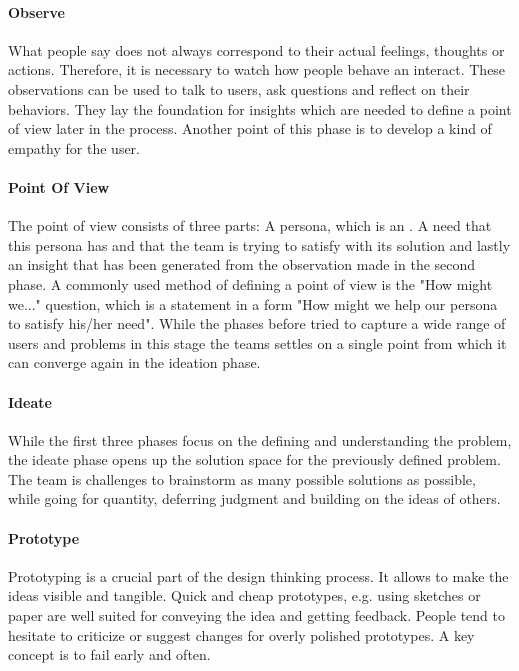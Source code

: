 \paragraph{Observe}
What people say does not always correspond to their actual feelings, thoughts or actions. Therefore, it is necessary to watch how people behave an interact. These observations can be used to talk to users, ask questions and reflect on their behaviors. They lay the foundation for insights which are needed to define a point of view later in the process. Another point of this phase is to develop a kind of empathy for the user.

\paragraph{Point Of View}
The point of view consists of three parts: A persona, which is an . A need that this persona has and that the team is trying to satisfy with its solution and lastly an insight that has been generated from the observation made in the second phase. A commonly used method of defining a point of view is the "How might we..." question, which is a statement in a form "How might we help our persona to satisfy his/her need".
While the phases before tried to capture a wide range of users and problems in this stage the teams settles on a single point from which it can converge again in the ideation phase. 

\paragraph{Ideate}
While the first three phases focus on the defining and understanding the problem, the ideate phase opens up the solution space for the previously defined problem. The team is challenges to brainstorm as many possible solutions as possible, while going for quantity, deferring judgment and building on the ideas of others.

\paragraph{Prototype}
Prototyping is a crucial part of the design thinking process. It allows to make the ideas visible and tangible. Quick and cheap prototypes, e.g. using sketches or paper are well suited for conveying the idea and getting feedback. People tend to hesitate to criticize or suggest changes for overly polished prototypes. A key concept is to fail early and often.

